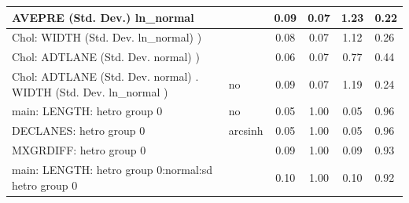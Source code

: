 \begin{table}
\begin{center}
\begin{tabular}{|l|l|c|c|c|l|}
			\hline
			AVEPRE (Std. Dev.) ln_normal &  & 0.09 & 0.07 & 1.23 & 0.22 \\
			\hline
			 Chol: WIDTH (Std. Dev. ln_normal) ) &  & 0.08 & 0.07 & 1.12 & 0.26 \\
			\hline
			 Chol: ADTLANE (Std. Dev. normal) ) &  & 0.06 & 0.07 & 0.77 & 0.44 \\
			\hline
			 Chol: ADTLANE (Std. Dev. normal) . WIDTH (Std. Dev.   ln_normal ) & no & 0.09 & 0.07 & 1.19 & 0.24 \\
			\hline
			main: LENGTH: hetro group 0 & no & 0.05 & 1.00 & 0.05 & 0.96 \\
			\hline
			DECLANES: hetro group 0 & arcsinh & 0.05 & 1.00 & 0.05 & 0.96 \\
			\hline
			MXGRDIFF: hetro group 0 &  & 0.09 & 1.00 & 0.09 & 0.93 \\
			\hline
			main: LENGTH: hetro group 0:normal:sd  hetro group 0 &  & 0.10 & 1.00 & 0.10 & 0.92 \\
			\hline
		\end{tabular}
	\end{center}
\end{table}